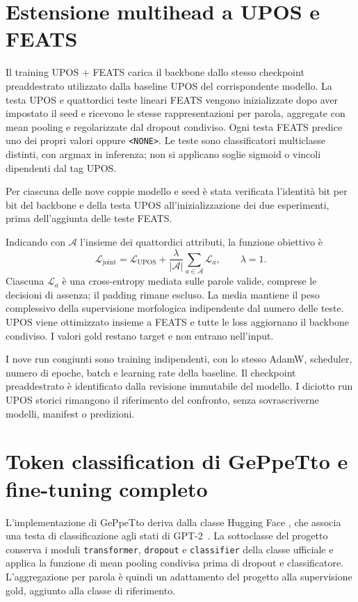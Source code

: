 \documentclass[12pt,a4paper]{report}
\newcommand{\modelid}[1]{{\small\path{#1}}}
\begin{document}
\section{Estensione multihead a UPOS e FEATS}
\label{sec:joint-feats-loss}
Il training UPOS + FEATS carica il backbone dallo stesso checkpoint preaddestrato utilizzato dalla baseline UPOS del corrispondente modello. La testa UPOS e quattordici teste lineari FEATS vengono inizializzate dopo aver impostato il seed e ricevono le stesse rappresentazioni per parola, aggregate con mean pooling e regolarizzate dal dropout condiviso. Ogni testa FEATS predice uno dei propri valori oppure \texttt{<NONE>}. Le teste sono classificatori multiclasse distinti, con argmax in inferenza; non si applicano soglie sigmoid o vincoli dipendenti dal tag UPOS.

Per ciascuna delle nove coppie modello e seed è stata verificata l'identità bit per bit del backbone e della testa UPOS all'inizializzazione dei due esperimenti, prima dell'aggiunta delle teste FEATS.

Indicando con $\mathcal A$ l'insieme dei quattordici attributi, la funzione obiettivo è
\begin{equation}
\label{eq:joint-feats-loss}
\mathcal L_{\mathrm{joint}}=\mathcal L_{\mathrm{UPOS}}+
\frac{\lambda}{|\mathcal A|}\sum_{a\in\mathcal A}\mathcal L_a,
\qquad \lambda=1.
\end{equation}
Ciascuna $\mathcal L_a$ è una cross-entropy mediata sulle parole valide, comprese le decisioni di assenza; il padding rimane escluso. La media mantiene il peso complessivo della supervisione morfologica indipendente dal numero delle teste. UPOS viene ottimizzato insieme a FEATS e tutte le loss aggiornano il backbone condiviso. I valori gold restano target e non entrano nell'input.

I nove run congiunti sono training indipendenti, con lo stesso AdamW, scheduler, numero di epoche, batch e learning rate della baseline. Il checkpoint preaddestrato è identificato dalla revisione immutabile del modello. I diciotto run UPOS storici rimangono il riferimento del confronto, senza sovrascriverne modelli, manifest o predizioni.

\section{Token classification di GePpeTto e fine-tuning completo}
\label{sec:geppetto-classification}

L'implementazione di GePpeTto deriva dalla classe Hugging Face \modelid{GPT2ForTokenClassification}, che associa una testa di classificazione agli stati di GPT-2~\cite{hfgpt2}. La sottoclasse del progetto conserva i moduli \texttt{transformer}, \texttt{dropout} e \texttt{classifier} della classe ufficiale e applica la funzione di mean pooling condivisa prima di dropout e classificatore. L'aggregazione per parola è quindi un adattamento del progetto alla supervisione gold, aggiunto alla classe di riferimento.
\end{document}
